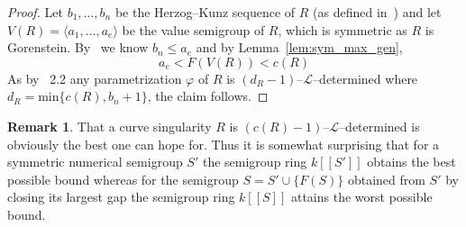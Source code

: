 \documentclass[a4paper,12pt,scrbook]{amsart}
\theoremstyle{plain}%
\theoremstyle{definition}
\newtheorem{rem}[satz]{Remark}
\begin{document}
\begin{proof}
Let $b_1, \ldots, b_n$ be the Herzog--Kunz sequence of $R$ 
(as defined in~\cite{HHMM}) and let $V(R) = 
\langle a_1, \ldots, a_e\rangle$ be the value semigroup of $R$, 
which is symmetric as $R$ is Gorenstein. 
By~\cite[Corollary 2.5]{HHMM} we know $b_n \leq a_e$ and by Lemma~\ref{lem:sym_max_gen}, 
	$$a_e < F(V(R)) <  c(R)$$ 
As by~\cite{HS} 2.2 any parametrization $\varphi$ of $R$ is 
$(d_R{-}1)$--$\mathcal{L}$--determined where
 $d_R =\mathrm{min}\{c(R), b_n+1\}$, 
the claim follows. 
\end{proof}

\begin{rem}
That a curve singularity $R$ is $(c(R){-}1)$--$\mathcal{L}$--determined 
is obviously the best one can hope for. Thus it is somewhat surprising that 
for a symmetric numerical semigroup $S'$ the semigroup ring $k[[S']]$ 
obtains the best possible bound whereas for the semigroup 
$S = S' \cup \{F(S)\}$ obtained from $S'$ by closing its largest gap 
the semigroup ring $k[[S]]$ attains the worst possible bound. 
\end{rem}

\bigbreak
\end{document}

